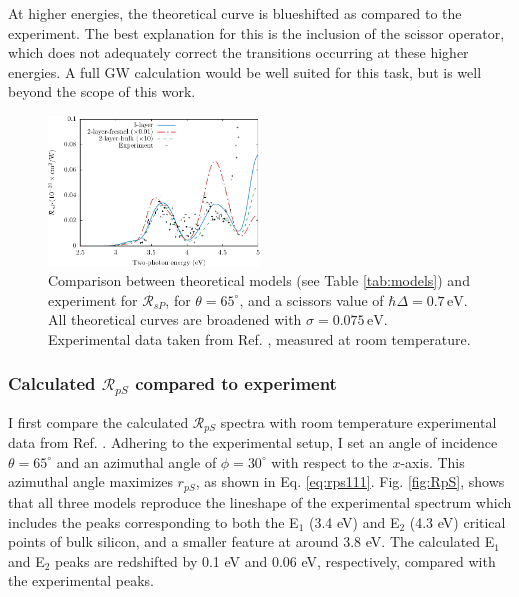 At higher energies, the theoretical curve is blueshifted as compared to the experiment. The best explanation for this is the inclusion of the scissor operator, which does not adequately correct the transitions occurring at these higher energies. A full GW calculation would be well suited for this task, but is well beyond the scope of this work.

\begin{figure}[H]
\centering
\includegraphics[width=0.5\textwidth]{content/figures/fig-Si1x1-Mejia_RsP}
\caption{Comparison between theoretical models (see Table \ref{tab:models}) and experiment for $\mathcal{R}_{sP}$, for $\theta=65^{\circ}$, and a scissors value of $\hbar\Delta = 0.7\,\text{eV}$. All theoretical curves are broadened with $\sigma=0.075\,\text{eV}$. Experimental data taken from Ref. \cite{mejiaPRB02}, measured at room temperature.}
\label{fig:RsP}
\end{figure}



\subsubsection{Calculated \texorpdfstring{$\mathcal{R}_{pS}$}{RpS} compared to 
experiment}\label{sec:1x1RpS}

I first compare the calculated $\mathcal{R}_{pS}$ spectra with room temperature experimental data from Ref. \cite{mejiaPRB02}. Adhering to the experimental setup, I set an angle of incidence $\theta=65^{\circ}$ and an azimuthal angle of $\phi=30^\circ$ with respect to the $x$-axis. This azimuthal angle maximizes $r_{pS}$, as shown in Eq. \eqref{eq:rps111}. Fig. \ref{fig:RpS}, shows that all three models reproduce the lineshape of the experimental spectrum which includes the peaks corresponding to both the E$_{1}$ (3.4 eV) and E$_{2}$ (4.3 eV) critical points of bulk silicon, and a smaller feature at around 3.8 eV. The calculated E$_{1}$ and E$_{2}$ peaks are redshifted by 0.1 eV and 0.06 eV, respectively, compared with the experimental peaks.

